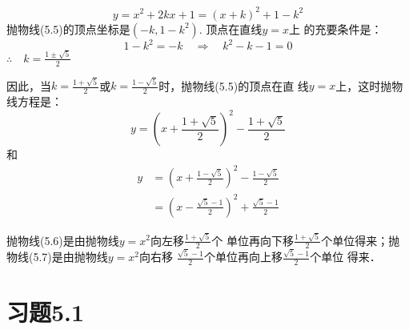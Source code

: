 \begin{solution}
\begin{equation}
    y=x^2+2kx+1=(x+k)^2+1-k^2
\end{equation}
抛物线(5.5)的顶点坐标是$(-k,1-k^2)$. 顶点在直线$y=x$上
的充要条件是：
\[1-k^2=-k\quad \Rightarrow\quad k^2-k-1=0\]
$\therefore\quad k=\frac{1\pm\sqrt{5}}{2}$

因此，当$k=\frac{1+\sqrt{5}}{2}$或$k=\frac{1-\sqrt{5}}{2}$时，抛物线(5.5)的顶点在直
线$y=x$上，这时抛物线方程是：
\begin{equation}
y=\left(x+\frac{1+\sqrt{5}}{2}\right)^2-\frac{1+\sqrt{5}}{2}
\end{equation}
和
\begin{equation}
    \begin{split}
 y&=\left(x+\frac{1-\sqrt{5}}{2}\right)^2-\frac{1-\sqrt{5}}{2}\\
&=\left(x-\frac{\sqrt{5}-1}{2}\right)^2+\frac{\sqrt{5}-1}{2}
    \end{split}
\end{equation}  

抛物线(5.6)是由抛物线$y=x^2$向左移$\frac{1+\sqrt{5}}{2}$个
单位再向下移$\frac{1+\sqrt{5}}{2}$个单位得来；抛物线(5.7)是由抛物线$y=x^2$向右移
$\frac{\sqrt{5}-1}{2}$个单位再向上移$\frac{\sqrt{5}-1}{2}$个单位
得来．
\end{solution}

\section*{习题5.1}


